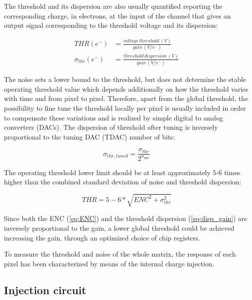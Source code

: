 The threshold and its dispersion are also usually quantified reporting the corresponding charge, in electrons, at the input of the channel that gives an output signal corresponding to the threshold voltage and its dispersion:

\begin{align}
THR (e^{-}) & = \frac{voltage \, threshold \, (V)}{gain \, (V/e^{-})} \label{eq:th_gain} \\
\sigma_{thr} (e^{-})    & = \frac{threshold \, dispersion \, (V)}{gain \, (V/e^{-})} 
\label{eq:disp_gain}
\end{align}

The noise sets a lower bound to the threshold, but does not determine the stable operating threshold value which depends additionally on how the threshold varies with time and from pixel to pixel. 
Therefore, apart from the global threshold, the possibility to fine tune the threshold locally per pixel is usually included in order to compensate these variations and is realized by simple digital to analog converters (DACs). The dispersion of threshold after tuning is inversely proportional to the tuning DAC (TDAC) number of bits:

\begin{equation}
\sigma_{thr,tuned} = \frac{\sigma_{thr}}{2^{n_{dac}}}
\end{equation}

The operating threshold lower limit should be at least approximately 5-6 times higher than the combined standard deviation of noise and threshold dispersion:

\begin{equation}
THR=5-6 *\sqrt{ENC^{2} + \sigma_{thr}^{2}}
\end{equation}

Since both the ENC (\autoref{eq:ENC}) and the threshold dispersion (\autoref{eq:disp_gain}) are inversely proportional to the gain, a lower global threshold could be achieved increasing the gain, through an optimized choice of chip registers.


To measure the threshold and noise of the whole matrix, the response of each pixel has been characterized by means of the internal charge injection. \\

\subsection{Injection circuit} 
\label{inj_circuit_subsection}

